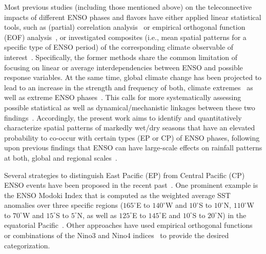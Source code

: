 \documentclass[utf8]{frontiersSCNS} %
\begin{document}
Most previous studies (including those mentioned above) on the teleconnective impacts of different ENSO phases and flavors have either applied linear statistical tools, such as (partial) correlation analysis~\citep{diaz2001, preethi2015impacts, weng2011anomalous, hidayat2018impact, magee2017influence} or empirical orthogonal function (EOF) analysis~\citep{taschetto_nino_2009}, or investigated composites (i.e., mean spatial patterns for a specific type of ENSO period) of the corresponding climate observable of interest~\citep{hoell2014, feng2014influence, song2017distinct}. Specifically, the former methods share the common limitation of focusing on linear or average interdependencies between ENSO and possible response variables. At the same time, global climate change has been projected to lead to an increase in the strength and frequency of both, climate extremes~\citep{karl2003modern,easterling2000observed} as well as extreme ENSO phases~\citep{cai_increasing_2014, cai2015increased}. This calls for more systematically assessing possible statistical as well as dynamical/mechanistic linkages between these two findings~\citep{allan_atmospheric_2008}. Accordingly, the present work aims to identify and quantitatively characterize spatial patterns of markedly wet/dry seasons that have an elevated probability to co-occur with certain types (EP or CP) of ENSO phases, following upon previous findings that ENSO can have large-scale effects on rainfall patterns at both, global and regional scales~\citep{dai_global_2000,ropelewski_global_1987}.

Several strategies to distinguish East Pacific (EP) from Central Pacific (CP) ENSO events have been proposed in the recent past~\citep{hendon_prospects_2009}. One prominent example is the ENSO Modoki Index that is computed as the weighted average SST anomalies over three specific regions ($165^\circ$E to $140^\circ$W and $10^\circ$S to $10^\circ$N, $110^\circ$W to $70^\circ$W and  $15^\circ$S to $5^\circ$N, as well as $125^\circ$E to $145^\circ$E and $10^\circ$S to $20^\circ$N) in the equatorial Pacific~\citep{ashok_nino_2007}. Other approaches have used empirical orthogonal functions~\citep{graf_central_2012,kao_contrasting_2009} or combinations of the Nino3 and Nino4 indices~\citep{kim_unique_2011,hu_analysis_2011} to provide the desired categorization. 
\end{document}
